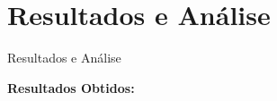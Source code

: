 \section{Resultados e Análise}
\begin{frame}{Resultados e Análise}

    \textbf{Resultados Obtidos:}
\end{frame}